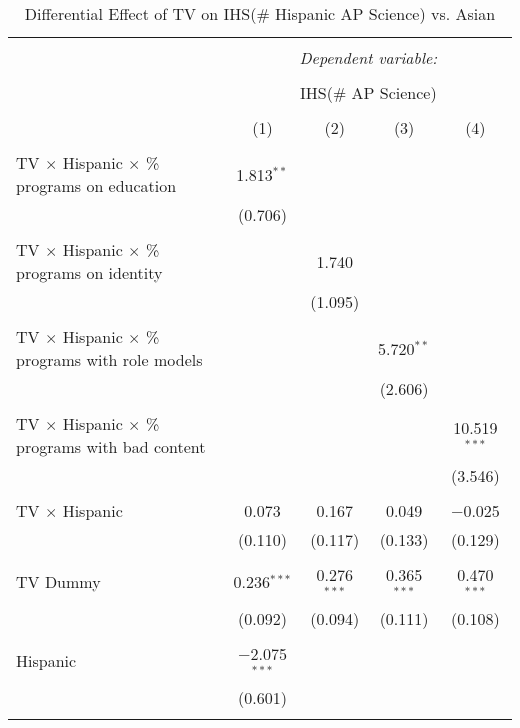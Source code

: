
\begin{table}[!htbp] \centering 
  \caption{Differential Effect of TV on IHS(\# Hispanic AP Science) vs. Asian} 
  \label{} 
\begin{tabular}{@{\extracolsep{-2pt}}lcccc} 
\\[-1.8ex]\hline 
\hline \\[-1.8ex] 
 & \multicolumn{4}{c}{\textit{Dependent variable:}} \\ 
\cline{2-5} 
\\[-1.8ex] & \multicolumn{4}{c}{IHS(\# AP Science)} \\ 
\\[-1.8ex] & (1) & (2) & (3) & (4)\\ 
\hline \\[-1.8ex] 
 TV $\times$ Hispanic $\times$ \% programs on education & 1.813$^{**}$ &  &  &  \\ 
  & (0.706) &  &  &  \\ 
  & & & & \\ 
 TV $\times$ Hispanic $\times$ \% programs on identity &  & 1.740 &  &  \\ 
  &  & (1.095) &  &  \\ 
  & & & & \\ 
 TV $\times$ Hispanic $\times$ \% programs with role models &  &  & 5.720$^{**}$ &  \\ 
  &  &  & (2.606) &  \\ 
  & & & & \\ 
 TV $\times$ Hispanic $\times$ \% programs with bad content &  &  &  & 10.519$^{***}$ \\ 
  &  &  &  & (3.546) \\ 
  & & & & \\ 
 TV $\times$ Hispanic & 0.073 & 0.167 & 0.049 & $-$0.025 \\ 
  & (0.110) & (0.117) & (0.133) & (0.129) \\ 
  & & & & \\ 
 TV Dummy & 0.236$^{***}$ & 0.276$^{***}$ & 0.365$^{***}$ & 0.470$^{***}$ \\ 
  & (0.092) & (0.094) & (0.111) & (0.108) \\ 
  & & & & \\ 
 Hispanic & $-$2.075$^{***}$ &  &  &  \\ 
  & (0.601) &  &  &  \\ 
  & & & & \\ 

\end{tabular}
\end{table}
